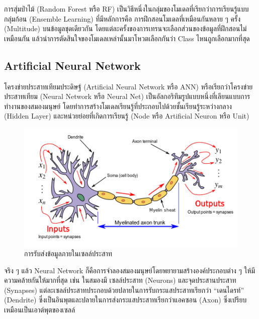 การสุ่มป่าไม้ (Random Forest หรือ RF) เป็นวิธีหนึ่งในกลุ่มของโมเดลที่เรียกว่าการเรียนรู้แบบกลุ่มก้อน (Ensemble Learning) ที่มีหลักการคือ%
การฝึกสอนโมเดลที่เหมือนกันหลาย ๆ ครั้ง (Multitude) บนข้อมูลชุดเดียวกัน โดยแต่ละครั้งของการเทรนจะเลือกส่วนของข้อมูลที่ฝึกสอนไม่เหมือนกัน 
แล้วนำการตัดสินใจของโมเดลเหล่านั้นมาโหวตเลือกกันว่า Class ไหนถูกเลือกมากที่สุด\autocite{breiman2001,quinlan1986}

\subsection{Artificial Neural Network}
\label{ssec:ann}

โครงข่ายประสาทเทียมประดิษฐ์ (Artificial Neural Network หรือ ANN) หรือเรียกว่าโครงข่ายประสาทเทียม (Neural Network หรือ 
Neural Net) เป็นอัลกอริทึมรูปแบบหนึ่งที่เลียนแบบการทำงานของสมองมนุษย์ โดยทำการสร้างโมเดลเรียนรู้ที่ประกอบไปด้วยชั้นเรียนรู้ระหว่างกลาง 
(Hidden Layer) และหน่วยย่อยที่เกิดการเรียนรู้ (Node หรือ Artificial Neuron หรือ Unit)

\begin{figure}[htbp]
    \centering
    \includegraphics[width=0.9\linewidth]{fig/neuron.png}
    \caption{การรับส่งข้อมูลภายในเซลล์ประสาท}
    \label{fig:neuron}
\end{figure}

จริง ๆ แล้ว Neural Network ก็คือการจำลองสมองมนุษย์โดยพยายามสร้างองค์ประกอบต่าง ๆ ให้มีความคล้ายกันให้มากที่สุด เช่น ในสมองมี%
เซลล์ประสาท (Neurons) และจุดประสานประสาท (Synapses) แต่ละเซลล์ประสาทประกอบด้วยปลายในการรับกระแสประสาทเรียกว่า 
\enquote{เดนไดรท์} (Dendrite) ซึ่งเป็นอินพุตและปลายในการส่งกระแสประสาทเรียกว่าแอคซอน (Axon) ซึ่งเปรียบเหมือนเป็นเอาต์พุตของเซลล์

